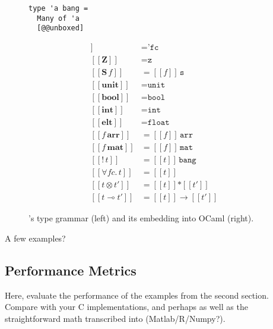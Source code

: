 \begin{figure}[tp]
\begin{minipage}{.3\textwidth}
\begin{verbatim}
type 'a bang =
  Many of 'a
  [@@unboxed]
        \end{verbatim}
    \end{minipage}
    \begin{minipage}{.3\textwidth}
        \begin{align*}
            [\![ f\!c ]\!] &= \texttt{'fc} \\
            [\![ \textbf{Z} ]\!] &= \texttt{z}\\
            [\![ \textbf{S} \, f ]\!] &= [\![ f ]\!]\, \texttt{s}\\
            [\![ \textbf{unit} ]\!] &= \texttt{unit}\\
            [\![ \textbf{bool} ]\!] &= \texttt{bool}\\
            [\![ \textbf{int} ]\!] &= \texttt{int}\\
            [\![ \textbf{elt} ]\!] &= \texttt{float}\\
            [\![ f\, \textbf{arr} ]\!] &= [\![ f ]\!]\, \texttt{arr}\\
            [\![ f\, \textbf{mat} ]\!] &= [\![ f ]\!]\, \texttt{mat}\\
            [\![ \textbf{!} \, t ]\!] &= [\![ t ]\!]\, \texttt{bang}\\
            [\![ \forall f\!c.\, t ]\!] &= [\![ t ]\!]\\
            [\![ t \otimes t' ]\!] &= [\![ t ]\!] \texttt{*} [\![ t' ]\!]\\
            [\![ t \multimap t' ]\!] &= [\![ t ]\!] \rightarrow [\![ t' ]\!]
        \end{align*}
    \end{minipage}
    \caption{\lang's type grammar (left) and its embedding into OCaml
        (right).}\label{fig:type_grammar}
\end{figure}
A few examples?

\subsection{Performance Metrics}

Here, evaluate the performance of the examples from the second
section.  Compare with your C implementations, and perhaps as well as
the straightforward math transcribed into (Matlab/R/Numpy?).
